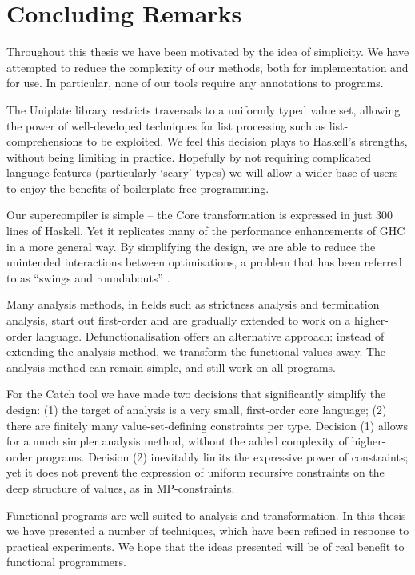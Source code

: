 \section{Concluding Remarks}
\label{secE:the_end}

Throughout this thesis we have been motivated by the idea of simplicity. We have attempted to reduce the complexity of our methods, both for implementation and for use. In particular, none of our tools require any annotations to programs.

The Uniplate library restricts traversals to a uniformly typed value set, allowing the power of well-developed techniques for list processing such as list-comprehensions to be exploited. We feel this decision plays to Haskell's strengths, without being limiting in practice. Hopefully by not requiring complicated language features (particularly `scary' types) we will allow a wider base of users to enjoy the benefits of boilerplate-free programming.

Our supercompiler is simple -- the Core transformation is expressed in just 300 lines of Haskell. Yet it replicates many of the performance enhancements of GHC in a more general way. By simplifying the design, we are able to reduce the unintended interactions between optimisations, a problem that has been referred to as ``swings and roundabouts'' \cite{marlow:fast_curry}.

Many analysis methods, in fields such as strictness analysis and termination analysis, start out first-order and are gradually extended to work on a higher-order language. Defunctionalisation offers an alternative approach: instead of extending the analysis method, we transform the functional values away. The analysis method can remain simple, and still work on all programs.

For the Catch tool we have made two decisions that significantly simplify the design: (1) the target of analysis is a very small, first-order core language; (2) there are finitely many value-set-defining constraints per type. Decision (1) allows for a much simpler analysis method, without the added complexity of higher-order programs. Decision (2) inevitably limits the expressive power of constraints; yet it does not prevent the expression of uniform recursive constraints on the deep structure of values, as in MP-constraints.

Functional programs are well suited to analysis and transformation. In this thesis we have presented a number of techniques, which have been refined in response to practical experiments. We hope that the ideas presented will be of real benefit to functional programmers.
